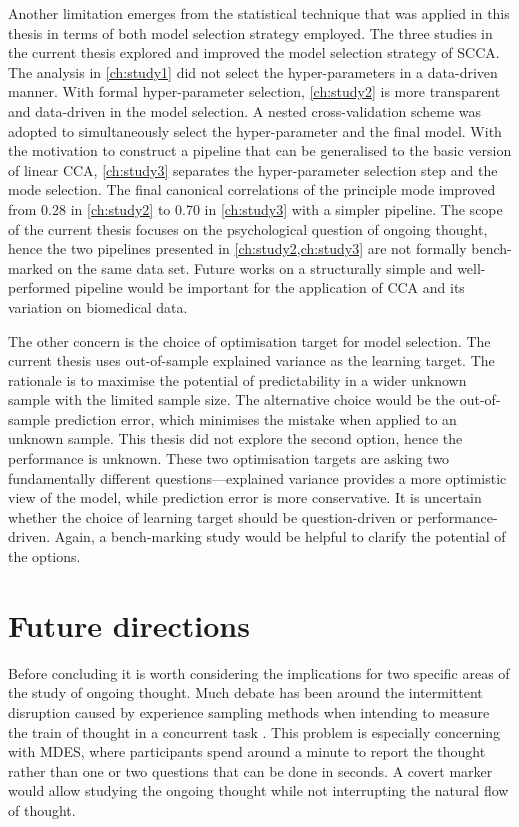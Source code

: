 Another limitation emerges from the statistical technique that was applied in this thesis in terms of both model selection strategy employed. The three studies in the current thesis explored and improved the model selection strategy of SCCA. The analysis in \cref{ch:study1} did not select the hyper-parameters in a data-driven manner. With formal hyper-parameter selection, \cref{ch:study2} is more transparent and data-driven in the model selection. A nested cross-validation scheme was adopted to simultaneously select the hyper-parameter and the final model. With the motivation to construct a pipeline that can be generalised to the basic version of linear CCA, \cref{ch:study3} separates the hyper-parameter selection step and the mode selection. The final canonical correlations of the principle mode improved from 0.28 in \cref{ch:study2} to 0.70 in \cref{ch:study3} with a simpler pipeline. The scope of the current thesis focuses on the psychological question of ongoing thought, hence the two pipelines presented in \cref{ch:study2,ch:study3} are not formally bench-marked on the same data set. Future works on a structurally simple and well-performed pipeline would be important for the application of CCA and its variation on biomedical data.

The other concern is the choice of optimisation target for model selection. The current thesis uses out-of-sample explained variance as the learning target. The rationale is to maximise the potential of predictability in a wider unknown sample with the limited sample size. The alternative choice would be the out-of-sample prediction error, which minimises the mistake when applied to an unknown sample. This thesis did not explore the second option, hence the performance is unknown. These two optimisation targets are asking two fundamentally different questions---explained variance provides a more optimistic view of the model, while prediction error is more conservative. It is uncertain whether the choice of learning target should be question-driven or performance-driven. Again, a bench-marking study would be helpful to clarify the potential of the options.



\section{Future directions}

Before concluding it is worth considering the implications for two specific areas of the study of ongoing thought. Much debate has been around the intermittent disruption caused by experience sampling methods when intending to measure the train of thought in a concurrent task \cite{SmallwoodSchooler2006}. This problem is especially concerning with MDES, where participants spend around a minute to report the thought rather than one or two questions that can be done in seconds. A covert marker would allow studying the ongoing thought while not interrupting the natural flow of thought.

